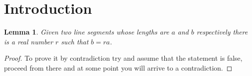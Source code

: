 \documentclass{article}
\newtheorem{lemma}[theorem]{Lemma}
\begin{document}
	\section{Introduction}
	\begin{lemma}
		Given two line segments whose lengths are \(a\) and \(b\) respectively there 
		is a real number \(r\) such that \(b=ra\).
	\end{lemma}
	
	\begin{proof}
		To prove it by contradiction try and assume that the statement is false,
		proceed from there and at some point you will arrive to a contradiction.
	\end{proof}
\end{document}
